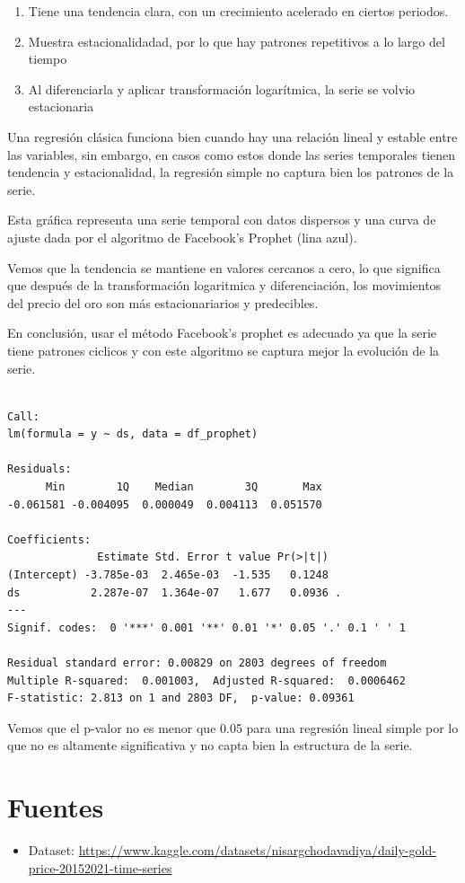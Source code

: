 \documentclass[
]{book}
\providecommand{\tightlist}{%
  \setlength{\itemsep}{0pt}\setlength{\parskip}{0pt}}
\begin{document}
\begin{enumerate}
\def\labelenumi{\arabic{enumi}.}
\tightlist
\item
  Tiene una tendencia clara, con un crecimiento acelerado en ciertos periodos.
\item
  Muestra estacionalidadad, por lo que hay patrones repetitivos a lo largo del tiempo
\item
  Al diferenciarla y aplicar transformación logarítmica, la serie se volvio estacionaria
\end{enumerate}

Una regresión clásica funciona bien cuando hay una relación lineal y estable entre las variables, sin embargo, en casos como estos donde las series temporales tienen
tendencia y estacionalidad, la regresión simple no captura bien los patrones de la serie.

Esta gráfica representa una serie temporal con datos dispersos y una curva de ajuste dada por el algoritmo de Facebook's Prophet (lina azul).

Vemos que la tendencia se mantiene en valores cercanos a cero, lo que significa que después de la transformación logaritmica y diferenciación, los movimientos del precio
del oro son más estacionariarios y predecibles.

En conclusión, usar el método Facebook's prophet es adecuado ya que la serie tiene patrones ciclicos y con este algoritmo se captura mejor la evolución de la serie.

\begin{verbatim}

Call:
lm(formula = y ~ ds, data = df_prophet)

Residuals:
      Min        1Q    Median        3Q       Max 
-0.061581 -0.004095  0.000049  0.004113  0.051570 

Coefficients:
              Estimate Std. Error t value Pr(>|t|)  
(Intercept) -3.785e-03  2.465e-03  -1.535   0.1248  
ds           2.287e-07  1.364e-07   1.677   0.0936 .
---
Signif. codes:  0 '***' 0.001 '**' 0.01 '*' 0.05 '.' 0.1 ' ' 1

Residual standard error: 0.00829 on 2803 degrees of freedom
Multiple R-squared:  0.001003,  Adjusted R-squared:  0.0006462 
F-statistic: 2.813 on 1 and 2803 DF,  p-value: 0.09361
\end{verbatim}

Vemos que el p-valor no es menor que 0.05 para una regresión lineal simple por lo que no es altamente significativa y no capta bien la estructura de la serie.

\chapter{Fuentes}\label{fuentes}

\begin{itemize}
\tightlist
\item
  Dataset: \url{https://www.kaggle.com/datasets/nisargchodavadiya/daily-gold-price-20152021-time-series}
\end{itemize}

  
\end{document}
